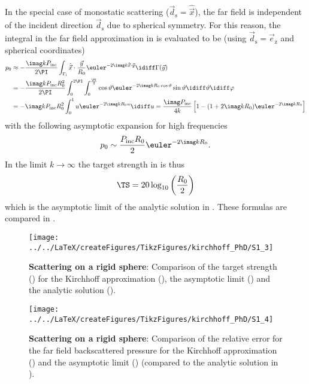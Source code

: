 In the special case of monostatic scattering ($\vec{d}_{\mathrm{s}}=\hat{\vec{x}}$), the far field is independent of the incident direction $\vec{d}_{\mathrm{s}}$ due to spherical symmetry. For this reason, the integral in the far field approximation in  is evaluated to be (using $\vec{d}_{\mathrm{s}}=\vec{e}_{\mathrm{z}}$ and spherical coordinates)
\begin{align}\label{Eq4:exactHelmholtz}
	p_0 &\approx -\frac{\imag kP_{\mathrm{inc}}}{2\PI}\int_{\Gamma_{\mathrm{i}}} \hat{\vec{x}}\cdot\frac{\vec{y}}{R_0} \euler^{-2\imag k \hat{\vec{x}}\cdot\vec{y}}\idiff \Gamma(\vec{y}) \\
	&= -\frac{\imag kP_{\mathrm{inc}}R_0^2}{2\PI}\int_0^{2\PI}\int_0^{\frac{\PI}{2}} \cos\vartheta \euler^{-2\imag k R_0 \cos\vartheta}\sin\vartheta\idiff\vartheta\idiff\varphi \\
	&= -\imag kP_{\mathrm{inc}}R_0^2\int_0^1 u \euler^{-2\imag k R_0 u}\idiff u = \frac{\imag P_{\mathrm{inc}}}{4k}\left[1-(1+2\imag kR_0)\euler^{-2\imag kR_0}\right]
\end{align}
with the following asymptotic expansion for high frequencies
\begin{equation}\label{Eq4:asymptotic_p_0}
	p_0 \sim \frac{P_{\mathrm{inc}}R_0}{2}\euler^{-2\imag kR_0}.
\end{equation}
In the limit $k\to\infty$ the target strength in  is thus
\begin{equation}\label{Eq4:asymptotic_TS}
	\TS = 20\log_{10}\left(\frac{R_0}{2}\right)
\end{equation}
which is the asymptotic limit of the analytic solution in . These formulas are compared in .
\begin{figure}
	\centering
	\texttt{[image: ../../LaTeX/createFigures/TikzFigures/kirchhoff\_PhD/S1\_3]}
	\caption{\textbf{Scattering on a rigid sphere}: Comparison of the target strength () for the Kirchhoff approximation (), the asymptotic limit () and the analytic solution ().}
	\label{Fig4:comparisonRigidSphere}
\end{figure}
\begin{figure}
	\centering
	\texttt{[image: ../../LaTeX/createFigures/TikzFigures/kirchhoff\_PhD/S1\_4]}
	\caption{\textbf{Scattering on a rigid sphere}: Comparison of the relative error for the far field backscattered pressure for the Kirchhoff approximation () and the asymptotic limit () (compared to the analytic solution in ).}
	\label{Fig4:comparisonRigidSphereError}
\end{figure}



